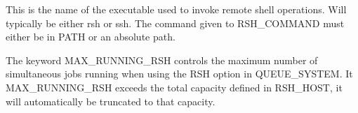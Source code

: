 \documentclass[a4paper,10pt,english]{sphinxmanual}
\begin{document}
\begin{sphinxShadowBox}

This is the name of the executable used to invoke remote shell operations.
Will typically be either rsh or ssh. The command given to RSH\_COMMAND must
either be in PATH or an absolute path.

%
\begin{sphinxVerbatim}[commandchars=\\\{\}]
\end{sphinxVerbatim}

The keyword MAX\_RUNNING\_RSH controls the maximum number of simultaneous jobs
running when using the RSH option in QUEUE\_SYSTEM. It MAX\_RUNNING\_RSH exceeds
the total capacity defined in RSH\_HOST, it will automatically be truncated to
that capacity.


%
\begin{sphinxVerbatim}[commandchars=\\\{\}]
      
   
 
\end{sphinxVerbatim}
\end{sphinxShadowBox}
\end{document}
